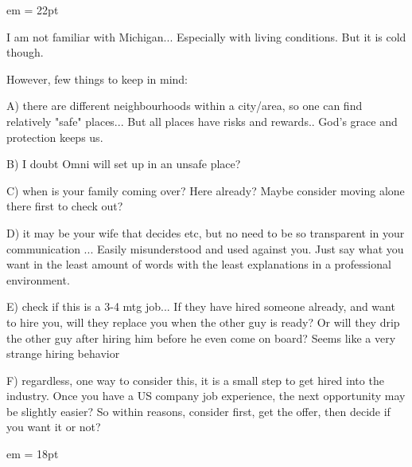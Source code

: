 

 em
\FFrk \baselineskip = 22pt


\par I am not familiar with Michigan... Especially with living conditions. But it is cold though.
\par \smallbreak       %
\par However, few things to keep in mind:
\par \smallbreak       %
\par A) there are different neighbourhoods within a city/area, so one can find relatively "safe" places... But all places have risks and rewards.. God's grace and protection keeps us.
\par \smallbreak       %
\par B) I doubt Omni will set up in an unsafe place?
\par \smallbreak       %
\par C) when is your family coming over? Here already? Maybe consider moving alone there first to check out?
\par \smallbreak       %
\par D) it may be your wife that decides etc, but no need to be so transparent in your communication ... Easily misunderstood and used against you. Just say what you want in the least amount of words with the least explanations in a professional environment.
\par \smallbreak       %
\par E) check if this is a 3-4 mtg job... If they have hired someone already, and want to hire you, will they replace you when the other guy is ready? Or will they drip the other guy after hiring him before he even come on board? Seems like a very strange hiring behavior
\par \smallbreak       %
\par F) regardless, one way to consider this, it is a small step to get hired into the industry. Once you have a US company job experience, the next opportunity may be slightly easier? So within reasons, consider first, get the offer, then decide if you want it or not?

\vfil
\break %

 em
\FFrj \baselineskip = 18pt

